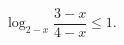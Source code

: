 \begin{ex}[type=inequality]
	\begin{condition}
		 $ \log_{2 - x}\dfrac{3 - x}{4 - x}\leqslant1 .$
	\end{condition}
\end{ex}